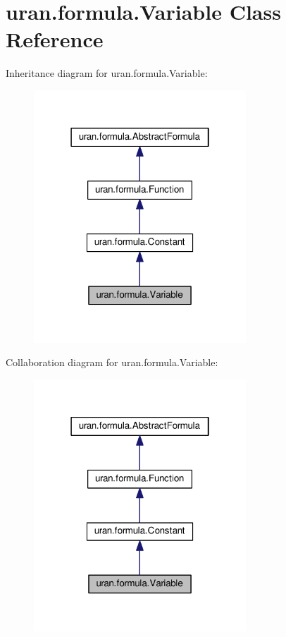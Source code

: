 \hypertarget{classuran_1_1formula_1_1_variable}{}\section{uran.\+formula.\+Variable Class Reference}
\label{classuran_1_1formula_1_1_variable}


Inheritance diagram for uran.\+formula.\+Variable\+:
\nopagebreak
\begin{figure}[H]
\begin{center}
\leavevmode
\includegraphics[width=226pt]{classuran_1_1formula_1_1_variable__inherit__graph}
\end{center}
\end{figure}


Collaboration diagram for uran.\+formula.\+Variable\+:
\nopagebreak
\begin{figure}[H]
\begin{center}
\leavevmode
\includegraphics[width=226pt]{classuran_1_1formula_1_1_variable__coll__graph}
\end{center}
\end{figure}

